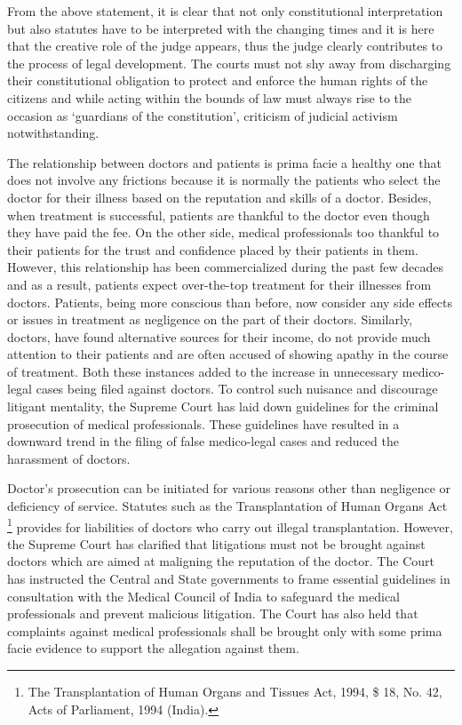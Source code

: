 \begin{multicols}{2}
\noi
From the above statement, it is clear that not only constitutional interpretation but also statutes
have to be interpreted with the changing times and it is here that the creative role of the judge
appears, thus the judge clearly contributes to the process of legal development. The courts must
not shy away from discharging their constitutional obligation to protect and enforce the human rights of the citizens and while acting within the bounds of law must always rise to the occasion
as ‘guardians of the constitution’, criticism of judicial activism notwithstanding.

\vspace{-.1cm}


\vspace{-.1cm}

\noi
The relationship between doctors and patients is prima facie a healthy one that does not involve
any frictions because it is normally the patients who select the doctor for their illness based on
the reputation and skills of a doctor. Besides, when treatment is successful, patients are thankful
to the doctor even though they have paid the fee. On the other side, medical professionals too
thankful to their patients for the trust and confidence placed by their patients in them. However,
this relationship has been commercialized during the past few decades and as a result, patients
expect over-the-top treatment for their illnesses from doctors. Patients, being more conscious than
before, now consider any side effects or issues in treatment as negligence on the part of their
doctors. Similarly, doctors, have found alternative sources for their income, do not provide much
attention to their patients and are often accused of showing apathy in the course of treatment.
Both these instances added to the increase in unnecessary medico-legal cases being filed against
doctors. To control such nuisance and discourage litigant mentality, the Supreme Court has laid
down guidelines for the criminal prosecution of medical professionals. These guidelines have
resulted in a downward trend in the filing of false medico-legal cases and reduced the harassment
of doctors.

\noi
Doctor’s prosecution can be initiated for various reasons other than negligence or deficiency of
service. Statutes such as the Transplantation of Human Organs Act \footnote{The Transplantation of Human Organs and Tissues Act, 1994, \$ 18, No. 42, Acts of Parliament, 1994 (India).} provides for liabilities of doctors who carry out illegal transplantation. However, the Supreme Court has clarified that
litigations must not be brought against doctors which are aimed at maligning the reputation of the
doctor. The Court has instructed the Central and State governments to frame essential guidelines
in consultation with the Medical Council of India to safeguard the medical professionals and
prevent malicious litigation. The Court has also held that complaints against medical professionals shall be brought only with some prima facie evidence to support the allegation against them.


\end{multicols}
